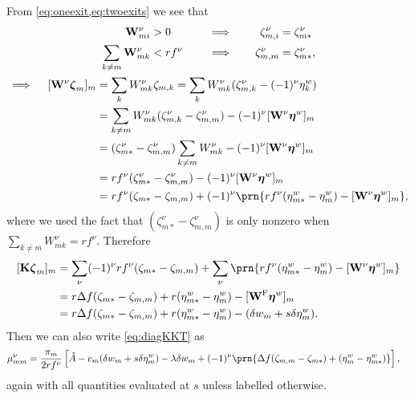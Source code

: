 \documentclass[12pt]{article}
\newcommand{\eqm}{\pi}
\newcommand{\etwm}{\eta^w}
\newcommand{\etw}{\boldsymbol{\eta}^w}
\newcommand{\dgnm}{\zeta}
\newcommand{\dgn}{\boldsymbol{\dgnm}}
\newcommand{\wm}{w}
\newcommand{\Wm}{W}
\newcommand{\W}{\mathbf{\Wm}}
\newcommand{\encm}{K}
\newcommand{\enc}{\mathbf{\encm}}
\newcommand{\frg}{\W^{\mathrm{F}}}
\newcommand{\kktm}{\mu}
\begin{document}
From \cref{eq:oneexit,eq:twoexits} we see that
%
\begin{equation*}
\begin{gathered}
  \begin{aligned}
    \W^\nu_{mi} &> 0 &
    \quad &\implies \quad &
    \dgnm^\nu_{m,i} &= \dgnm^\nu_{m*}
    \\
    \sum_{k \neq m} \W^\nu_{mk} &< r f^\nu &
    &\implies &
    \dgnm^\nu_{m,m} &= \dgnm^\nu_{m*},
  \end{aligned}
  \\
  \begin{aligned}
    \implies \quad
    [\W^\nu \dgn_m]_m
      &= \sum_k \Wm^\nu_{mk}  \dgnm_{m,k}
      = \sum_k \Wm^\nu_{mk}
        (\dgnm^\nu_{m,k} - (-1)^\nu \etwm_k) \\
      &= \sum_{k \neq m} \Wm^\nu_{mk} 
        (\dgnm^\nu_{m,k} - \dgnm^\nu_{m,m}) 
        - (-1)^\nu [\W^\nu \etw]_m \\
      &= (\dgnm^\nu_{m*} - \dgnm^\nu_{m,m}) 
        \sum_{k \neq m} \Wm^\nu_{mk}
        - (-1)^\nu [\W^\nu \etw]_m \\
      &= r f^\nu (\dgnm^\nu_{m*} - \dgnm^\nu_{m,m}) 
        - (-1)^\nu [\W^\nu \etw]_m \\
      &= r f^\nu (\dgnm_{m*} - \dgnm_{m,m}) 
        + (-1)^\nu \prn{
          r f^\nu (\etwm_{m*} - \etwm_m)
          - [\W^\nu \etw]_m
        },
  \end{aligned}
\end{gathered}
\end{equation*}
%
where we used the fact that \( (\dgnm^\nu_{m*} - \dgnm^\nu_{m,m}) \) is only nonzero when \( \sum_{k \neq m} \Wm^\nu_{mk} = rf^\nu \).
Therefore
%
\begin{equation*}
\begin{aligned}
  [\enc \dgn_m]_m
    &= \sum_{\nu} (-1)^\nu rf^\nu 
      (\dgnm_{m*} - \dgnm_{m,m}) 
      + \sum_{\nu} \prn{
        r f^\nu (\etwm_{m*} - \etwm_m)
        -  [\W^\nu \etw]_m
      } \\
    &= r\Delta f (\dgnm_{m*} - \dgnm_{m,m}) 
      + r(\etwm_{m*} - \etwm_m)
      - [\frg \etw]_m \\
    &= r\Delta f (\dgnm_{m*} - \dgnm_{m,m}) 
      + r(\etwm_{m*} - \etwm_m)
      - (\delta w_m + s \delta \etwm_m).
\end{aligned}
\end{equation*}
%
Then we can also write \cref{eq:diagKKT} as
%
\begin{equation}\label{eq:diagKKTz}
\begin{aligned}
  \kktm^\nu_{mm} &= \frac{\eqm_m}{2rf^\nu} 
    \left[ 
      \hat{A}
      - c_m (\delta \wm_m + s \delta \etwm_m)
      - \lambda \delta w_m
      + (-1)^\nu \prn{ 
        \Delta f (\dgnm_{m,m} - \dgnm_{m*}) 
        + (\etwm_m - \etwm_{m*})
      }
    \right],
\end{aligned}
\end{equation}
%
again with all quantities evaluated at \(s\) unless labelled otherwise.
\end{document}
